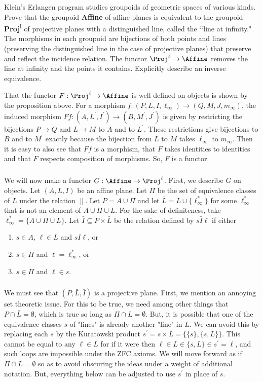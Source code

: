 \documentclass[main.tex]{subfiles}
\begin{document}
\begin{exercise}
	Klein's Erlangen program studies groupoids of geometric spaces of various
	kinds. Prove that the groupoid {\bf Affine} of affine planes is equivalent
	to the groupoid {\bf Proj\textsuperscript{l}} of projective planes with a
	distinguished line, called the \lq\lq line at infinity." The morphisms in
	each groupoid are bijections of both points and lines (preserving the
	distinguished line in the case of projective planes) that preserve and
	reflect the incidence relation. The functor $\Proj^\ell\rightarrow\Affine$
	removes the line at infinity and the points it contains. Explicitly describe
	an inverse equivalence.
\end{exercise}

That the functor $F:\Proj^\ell\rightarrow\Affine$ is well-defined on objects is
shown by the proposition above. For a morphism
$f:(P,L,I,\ell_\infty)\rightarrow(Q,M,J,m_\infty)$, the induced morphism
$Ff:(A,L^\prime,I^\prime)\rightarrow(B,M^\prime,J^\prime)$ is given by
restricting the bijections $P\rightarrow Q$ and $L\rightarrow M$ to $A$ and to
$L^\prime$. These restrictions give bijections to $B$ and to $M^\prime$ exactly
because the bijection from $L$ to $M$ takes $\ell_\infty$ to $m_\infty$. Then it
is easy to also see that $Ff$ is a morphism, that $F$ takes identities to
identities and that $F$ respects composition of morphisms. So, $F$ is a functor.

\subparagraph{}
We will now make a functor $G:\Affine\rightarrow\Proj^\ell$. First, we describe
$G$ on objects. Let $(A,L,I)$ be an affine plane. Let $\Pi$ be the set of
equivalence classes of $L$ under the relation $\parallel$. Let $P=A\cup\Pi$ and
let $\bar L=L\cup\{\ell^*_\infty\}$ for some $\ell^*_\infty$ that is not an
element of $A\cup\Pi\cup L$. For the sake of definiteness, take
$\ell^*_\infty=\{A\cup\Pi\cup L\}$. Let $\bar I\subseteq P\times\bar L$ be the
relation defined by $s\bar I\ell$ if either
\begin{enumerate}
	\item $s\in A$, $\ell\in L$ and $sI\ell$, or
	\item $s\in\Pi$ and $\ell=\ell^*_\infty$, or
	\item $s\in\Pi$ and $\ell\in s$.
\end{enumerate}

\subparagraph{}
We must see that $(P,\bar L,\bar I)$ is a projective plane. First, we mention an
annoying set theoretic issue. For this to be true, we need among other things
that $P\cap\bar L=\emptyset$, which is true so long as $\Pi\cap L=\emptyset$.
But, it is possible that one of the equivalence classes $s$ of "lines" is
already another "line" in $L$. We can avoid this by replacing each $s$ by the
Kuratowski product $s^\prime =s\times L=\{\{s\},\{s,L\}\}$. This cannot be equal
to any $\ell\in L$ for if it were then $\ell\in L\in\{s,L\}\in s^\prime =\ell$,
and such loops are impossible under the ZFC axioms. We will move forward as if
$\Pi\cap L=\emptyset$ so as to avoid obscuring the ideas under a weight of
additional notation. But, everything below can be adjusted to use $s^\prime$ in
place of $s$.
\end{document}
